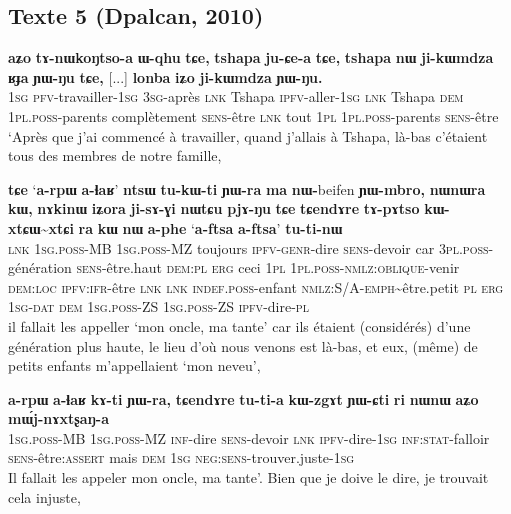 \documentclass[oneside,a4paper,11pt]{article}
\newcommand{\ipa}[1]{{\phon\textbf{#1}}}
\newcommand{\tld}{\textasciitilde{}}
\begin{document}
\subsection{Texte 5 (Dpalcan, 2010)}
\begin{exe}
\ex 
\gll 
\ipa{aʑo} 	\ipa{tɤ-nɯkoŋtso-a} 	\ipa{ɯ-qhu} 	\ipa{tɕe,} 	\ipa{tshapa} 	\ipa{ju-ɕe-a} 	\ipa{tɕe,} 	\ipa{tshapa} 	\ipa{nɯ} 	\ipa{ji-kɯmdza} 	\ipa{ʁɟa} 	\ipa{ɲɯ-ŋu} 	\ipa{tɕe,} 	[...] \ipa{lonba} 	\ipa{iʑo} 	\ipa{ji-kɯmdza} 	\ipa{ɲɯ-ŋu.}  \\
\textsc{1sg} \textsc{pfv}-travailler-\textsc{1sg} \textsc{3sg}-après \textsc{lnk} Tshapa \textsc{ipfv}-aller-\textsc{1sg} \textsc{lnk} Tshapa \textsc{dem} \textsc{1pl.poss}-parents  complètement \textsc{sens}-être \textsc{lnk} { } tout \textsc{1pl} \textsc{1pl.poss}-parents  \textsc{sens}-être \\
\glt `Après que j'ai commencé à travailler, quand j'allais à Tshapa, là-bas c'étaient tous des membres de notre famille,
\end{exe}
\begin{exe}
\ex 
\gll 
\ipa{tɕe} 	`\ipa{a-rpɯ} 	\ipa{a-ɬaʁ}' 	\ipa{ntsɯ} 	\ipa{tu-kɯ-ti} 	\ipa{ɲɯ-ra} 	\ipa{ma} 	\ipa{nɯ-}beifen 	\ipa{ɲɯ-mbro,} 	\ipa{nɯnɯra} 	\ipa{kɯ,} 	\ipa{nɤkinɯ} 	\ipa{iʑora} 	\ipa{ji-sɤ-ɣi} 	\ipa{nɯtɕu} 	\ipa{pjɤ-ŋu} 	\ipa{tɕe}  \ipa{tɕendɤre} 	\ipa{tɤ-pɤtso} 	\ipa{kɯ-xtɕɯ\tld{}xtɕi} 	\ipa{ra} 	\ipa{kɯ} 	\ipa{nɯ} 	\ipa{a-phe} `\ipa{a-ftsa} 	\ipa{a-ftsa}' 	\ipa{tu-ti-nɯ}\\
\textsc{lnk} \textsc{1sg.poss}-MB  \textsc{1sg.poss}-MZ toujours \textsc{ipfv-genr}-dire \textsc{sens}-devoir car \textsc{3pl.poss}-génération \textsc{sens}-être.haut \textsc{dem:pl} \textsc{erg} ceci \textsc{1pl} \textsc{1pl.poss-nmlz:oblique}-venir \textsc{dem:loc} \textsc{ipfv:ifr}-être \textsc{lnk}  \textsc{lnk} \textsc{indef.poss}-enfant  \textsc{nmlz:S/A-emph}\tld{}être.petit \textsc{pl} \textsc{erg} \textsc{1sg-dat} \textsc{dem} \textsc{1sg.poss}-ZS \textsc{1sg.poss}-ZS \textsc{ipfv}-dire-\textsc{pl} \\ 
\glt il fallait les appeller `mon oncle, ma tante' car ils étaient (considérés) d'une génération plus haute, le lieu d'où nous venons est là-bas, et eux, (même) de petits enfants m'appellaient  `mon neveu',
\end{exe}
 \begin{exe}
\ex 
\gll 
\ipa{a-rpɯ} 	\ipa{a-ɬaʁ} 	\ipa{kɤ-ti} 	\ipa{ɲɯ-ra,} 	\ipa{tɕendɤre} 	\ipa{tu-ti-a} 	\ipa{kɯ-zgɤt} 	\ipa{ɲɯ-ɕti} 	\ipa{ri} 	\ipa{nɯnɯ} 	\ipa{aʑo} 	\ipa{mɯ́j-nɤxtʂaŋ-a} \\
\textsc{1sg.poss}-MB \textsc{1sg.poss}-MZ \textsc{inf}-dire \textsc{sens}-devoir \textsc{lnk} \textsc{ipfv}-dire-\textsc{1sg} \textsc{inf:stat}-falloir \textsc{sens}-être:\textsc{assert} mais \textsc{dem} \textsc{1sg} \textsc{neg:sens}-trouver.juste-\textsc{1sg} \\
\glt Il fallait les appeler  mon oncle, ma tante'. Bien que je doive le dire, je trouvait cela injuste,
\end{exe}
\end{document}
